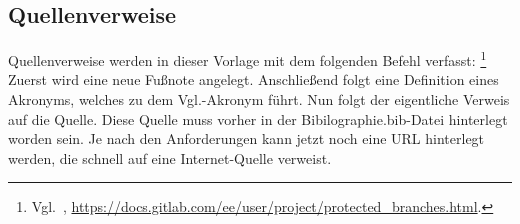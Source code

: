 \subsection{Quellenverweise}

Quellenverweise werden in dieser Vorlage mit dem folgenden Befehl verfasst:
\footnote{\ac{Vgl.}~\textcite{qualls_protected_2023}, \url{https://docs.gitlab.com/ee/user/project/protected_branches.html}.}\\
Zuerst wird eine neue Fußnote angelegt.
Anschließend folgt eine Definition eines Akronyms, welches zu dem Vgl.-Akronym führt.
Nun folgt der eigentliche Verweis auf die Quelle.
Diese Quelle muss vorher in der Bibilographie.bib-Datei hinterlegt worden sein.
Je nach den Anforderungen kann jetzt noch eine URL hinterlegt werden, die schnell auf eine Internet-Quelle verweist.
